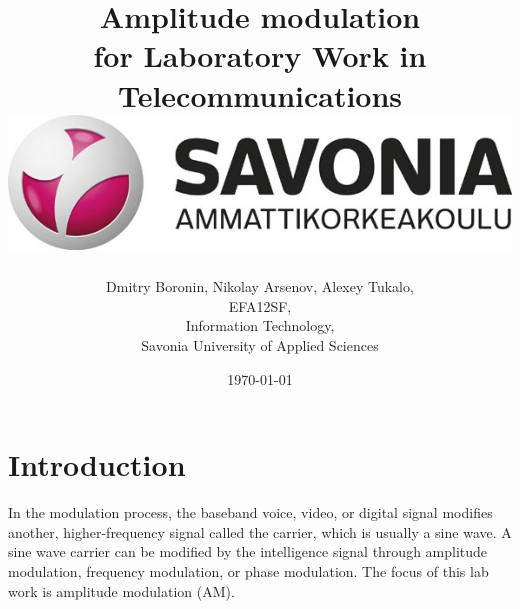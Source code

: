\documentclass[english]{article}
\date{}
\begin{document}
\title{\vspace{2in}Amplitude modulation\\
\small for Laboratory Work in Telecommunications\\
\vspace{0.5in}\includegraphics{savonia.jpg}}

\nopagebreak
\maketitle


\vspace{3in}

\author{
\begin{flushright}
Dmitry Boronin, Nikolay Arsenov, Alexey Tukalo,\\
EFA12SF,\\
Information Technology,\\
Savonia University of Applied Sciences
\end{flushright}
}

\date{\today}
\thispagestyle{empty}

\newpage
\setcounter{page}{1}
\setcounter{tocdepth}{2}
\tableofcontents

\newpage

\section{Introduction}
In the modulation process, the baseband voice, video, or digital signal modifies
another, higher-frequency signal called the carrier, which is usually a sine wave.
A sine wave carrier can be modified by the intelligence signal through amplitude modulation, frequency modulation, or phase modulation. The focus of this lab work is amplitude modulation (AM).
\end{document}
